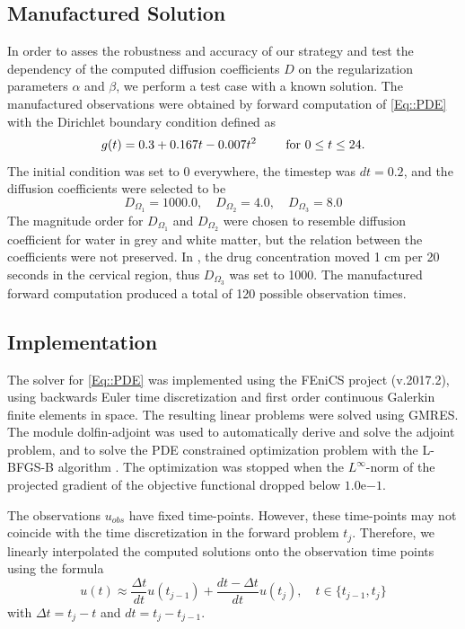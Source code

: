 \documentclass[12pt,a4paper]{article}
\begin{document}
\subsection{Manufactured Solution}
In order to asses the robustness and accuracy of our strategy and test the dependency of the computed diffusion coefficients $D$ on the
regularization parameters $\alpha$ and $\beta$, we perform a test case with a
known solution.  
The manufactured observations were obtained by forward computation of \eqref{Eq::PDE} with the Dirichlet boundary condition defined as
\begin{equation}
g(t) = 0.3 +0.167t - 0.007t\sp{2} \qquad \text{ for } 0 \leq t \leq 24.
\label{EQ::DIRI}
\end{equation}
The initial condition was set to 0 everywhere, the timestep was $dt = 0.2$, and the diffusion coefficients were selected to be 
\begin{equation}
D_{\Omega_1} = 1000.0, \quad D_{\Omega_2} = 4.0, \quad D_{\Omega_3} = 8.0 
\end{equation}  
The magnitude order for $D_{\Omega_1} $ and $D_{\Omega_2}$ were chosen to resemble diffusion coefficient for water in grey and white matter, but the relation between the coefficients were not preserved. In \citet{Haga}, the drug concentration moved 1 cm per 20 seconds in the cervical region, thus $D_{\Omega_3}$  was set to 1000. The manufactured forward computation produced a total of 120 possible observation times.


\subsection{Implementation}
The solver for \eqref{Eq::PDE} was implemented using the FEniCS project (v.2017.2), using backwards Euler time discretization and first order continuous Galerkin finite elements in space. The resulting linear problems were solved using GMRES.
The module dolfin-adjoint \cite{farrell2013automated, funke2013framework} was used to automatically derive and solve the adjoint problem, and to solve the PDE constrained optimization problem with the L-BFGS-B algorithm \cite{LBFGSB1, LBFGSB2}. The optimization was stopped when the $L^\infty$-norm of the projected gradient of the objective functional dropped below $1.0\mathrm{e}{-1}$.

The observations $u_{obs}$ have fixed time-points. However, these time-points may not coincide  with the time discretization in the forward problem $t_j$. Therefore, we linearly interpolated the computed solutions onto the observation time points using the formula
\begin{equation}
\label{observation:interpolation}
u(t) \approx \frac{\Delta t}{dt} u(t_{j-1}) + \frac{dt - \Delta t }{dt} u(t_{j}), \quad t \in \lbrace t_{j-1}, t_j \rbrace
\end{equation}
with $\Delta t = t_j-t$ and $dt = t_j - t_{j-1}$.
\end{document}
